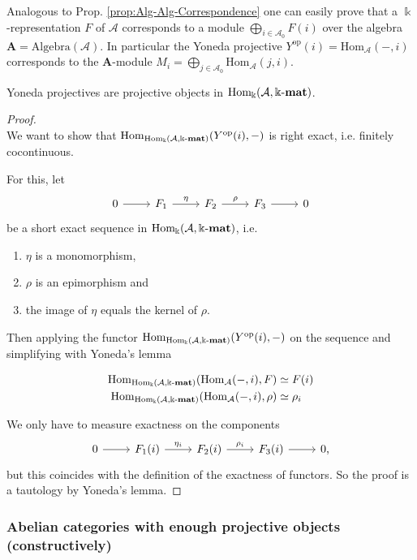 Analogous to Prop. \ref{prop:Alg-Alg-Correspondence} one can easily prove that a $\Bbbk$-representation $F$ of $\mathcal{A}$ corresponds to a 
module $\bigoplus_{i \in \mathcal{A}_{0}} F(i)$ over the algebra $\mathbf{A} = \mathrm{Algebra}(\mathcal{A})$.
In particular the Yoneda projective $Y^{\text{op}}(i) = \mathrm{Hom}_{\mathcal{A}}(-,i)$ corresponds to the $\mathbf{A}$-module
$M_{i} = \bigoplus_{j \in \mathcal{A}_{0}} \mathrm{Hom}_{\mathcal{A}}(j,i)$.

\begin{lemma}
Yoneda projectives are projective objects in $\mathrm{Hom_{\Bbbk}}(\mathcal{A},\Bbbk\textnormal{-}\mathbf{mat})$.
\end{lemma}
\begin{proof}\phantom{}\\
We want to show that $\mathrm{Hom}_{\mathrm{Hom_{\Bbbk}}(\mathcal{A},\Bbbk\textnormal{-}\mathbf{mat})}(Y^{\text{op}}(i),-)$ is right exact, i.e. finitely cocontinuous.

\noindent For this, let
\[
\begin{tikzcd}
0 \arrow[r] & F_{1} \arrow[r, "\eta"] & F_{2} \arrow[r,"\rho"] & F_{3} \arrow[r] & 0
\end{tikzcd}
\]
be a short exact sequence in $\mathrm{Hom_{\Bbbk}}(\mathcal{A},\Bbbk\textnormal{-}\mathbf{mat})$, i.e.
\begin{enumerate}
\item $\eta$ is a monomorphism,
\item $\rho$ is an epimorphism and
\item the image of $\eta$ equals the kernel of $\rho$.
\end{enumerate}

\noindent Then applying the functor $\mathrm{Hom}_{\mathrm{Hom_{\Bbbk}}(\mathcal{A},\Bbbk\textnormal{-}\mathbf{mat})}(Y^{\text{op}}(i),-)$ on the sequence and simplifying with Yoneda's lemma

\begin{align*}
\mathrm{Hom}_{\mathrm{Hom_{\Bbbk}}(\mathcal{A},\Bbbk\textnormal{-}\mathbf{mat})}(\mathrm{Hom}_{\mathcal{A}}(-,i),F) &\simeq F(i) \\
\mathrm{Hom}_{\mathrm{Hom_{\Bbbk}}(\mathcal{A},\Bbbk\textnormal{-}\mathbf{mat})}(\mathrm{Hom}_{\mathcal{A}}(-,i),\rho) &\simeq \rho_{i}
\end{align*}

We only have to measure exactness on the components
\[
\begin{tikzcd}
0 \arrow[r] & F_{1}(i) \arrow[r, "\eta_{i}"] &
F_{2}(i) \arrow[r,"\rho_{i}"] & F_{3}(i) \arrow[r] & 0\mbox{,}
\end{tikzcd}
\]
but this coincides with the definition of the exactness of functors. So the proof is a tautology by Yoneda's lemma.
\end{proof}

\subsubsection{Abelian categories with enough projective objects (constructively)}

